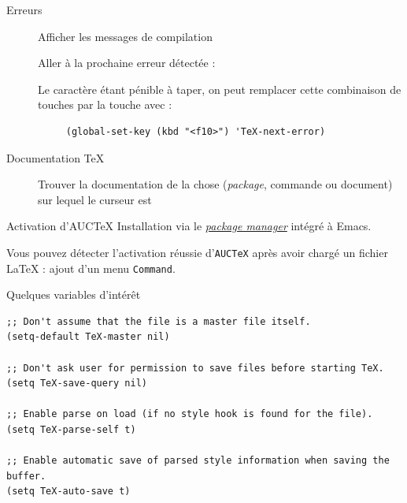 \documentclass[t]{beamer}
\let\ORIkeys\keys
\renewcommand{\keys}[1]{\ORIkeys{\texttt{#1}}}
\newcommand{\repeatedkeys}[1]{\keys{\textcolor{gray}{#1}}}
\begin{document}
\begin{frame}[fragile,label={sec:org10c4151}]{Erreurs}
 \begin{description}
\item[{\keys{C-c} \keys{C-l}}] Afficher les messages de compilation

\item[{\repeatedkeys{C-c} \keys{`}}] Aller à la prochaine erreur détectée :

Le caractère \keys{`} étant pénible à taper, on peut remplacer cette
combinaison de touches par la touche \keys{f10} avec :

\lstset{language=Lisp,label= ,caption= ,captionpos=b,numbers=none}
\begin{lstlisting}
     (global-set-key (kbd "<f10>") 'TeX-next-error)
\end{lstlisting}
\end{description}
\end{frame}

\begin{frame}[label={sec:org649b05c}]{Documentation \TeX{}}
\begin{description}
\item[{\keys{C-c} \keys{?}}] Trouver la documentation de la chose (\emph{package}, commande ou document) sur
lequel le curseur est
\end{description}
\end{frame}

\begin{frame}[fragile,label={sec:org4a621ad}]{Activation d'AUC\TeX{}}
 Installation via le
\hyperlink{package-manager}{\emph{package manager}}
intégré à Emacs.

Vous pouvez détecter l'\alert{activation} réussie d'\texttt{AUCTeX} après avoir chargé un
fichier \LaTeX{} : ajout d'un menu \texttt{Command}.
\end{frame}

\begin{frame}[fragile,label={sec:org706862e}]{Quelques variables d'intérêt}
 \lstset{language=Lisp,label= ,caption= ,captionpos=b,numbers=none}
\begin{lstlisting}
;; Don't assume that the file is a master file itself.
(setq-default TeX-master nil)

;; Don't ask user for permission to save files before starting TeX.
(setq TeX-save-query nil)

;; Enable parse on load (if no style hook is found for the file).
(setq TeX-parse-self t)

;; Enable automatic save of parsed style information when saving the buffer.
(setq TeX-auto-save t)
\end{lstlisting}
\end{frame}
\end{document}
